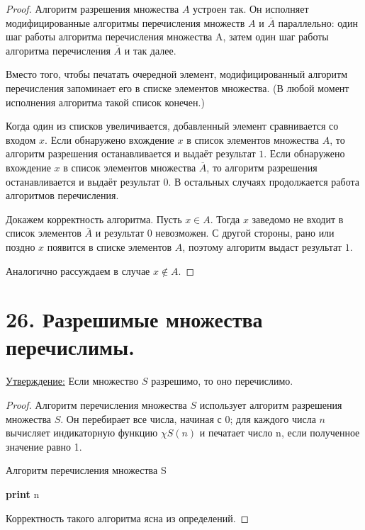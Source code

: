 \documentclass[a4paper, 12pt]{article}
\newcommand{\statement}{\underline{Утверждение:} }
\begin{document}
\begin{proof}

Алгоритм разрешения множества $A$ устроен так. Он исполняет
модифицированные алгоритмы перечисления множеств $A$ и $\overline{A}$ параллельно: один шаг работы алгоритма перечисления множества A, затем один шаг работы алгоритма перечисления $\overline{A}$ и так далее.

Вместо того, чтобы печатать очередной элемент, модифицированный алгоритм
перечисления запоминает его в списке элементов множества. (В любой момент исполнения алгоритма такой список конечен.)

Когда один из списков увеличивается, добавленный элемент сравнивается со входом $x$. Если обнаружено вхождение $x$ в список элементов множества $A$, то алгоритм разрешения останавливается и выдаёт результат $1$. Если обнаружено вхождение $x$ в список элементов множества $\overline{A}$, то алгоритм разрешения останавливается и выдаёт результат 0. В остальных случаях продолжается работа алгоритмов перечисления.

Докажем корректность алгоритма. Пусть $x \in A$. Тогда $x$ заведомо не входит в список элементов $\overline{A}$ и результат $0$ невозможен. С другой стороны, рано или поздно $x$ появится в списке элементов $A$, поэтому алгоритм выдаст результат $1$.

Аналогично рассуждаем в случае $x \notin A$.

\end{proof}

\section*{26. Разрешимые множества перечислимы.}

\statement{Если множество $S$ разрешимо, то оно перечислимо.}

\begin{proof}
Алгоритм перечисления множества $S$ использует алгоритм разрешения множества $S$. Он перебирает все числа, начиная с 0; для каждого числа
$n$ вычисляет индикаторную функцию $\chi S(n)$ и печатает число n, если полученное
значение равно 1.

            \begin{algorithm}
            \caption{Алгоритм перечисления множества S}
            \begin{algorithmic}[1]
                        \State \textbf{print} n
                    \EndIf
                \EndFor
            \EndFunction
            \end{algorithmic}
            \end{algorithm}
            
Корректность такого алгоритма ясна из определений.
\end{proof}
\end{document}
